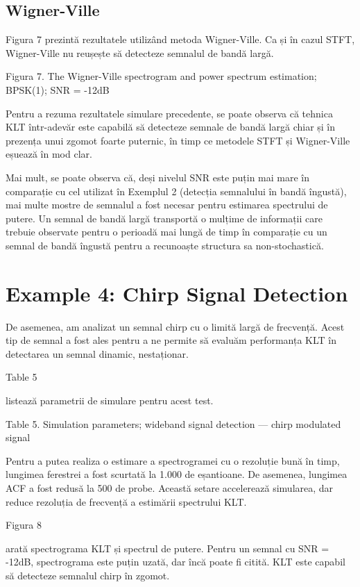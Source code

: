 \documentclass[12pt]{report}
\begin{document}
\subsection*{Wigner-Ville}

Figura 7 prezintă rezultatele utilizând metoda Wigner-Ville. Ca și în cazul STFT, Wigner-Ville nu reușește să detecteze semnalul de bandă largă.
\begin{center}
	\color{blue}Figura 7. The Wigner-Ville spectrogram and power spectrum estimation; BPSK(1); SNR = -12dB
\end{center}
Pentru a rezuma rezultatele simulare precedente, se poate observa că tehnica KLT într-adevăr este capabilă să detecteze semnale de bandă largă chiar și în prezența unui zgomot foarte puternic, în timp ce metodele STFT și Wigner-Ville eșuează în mod clar.

Mai mult, se poate observa că, deși nivelul SNR este puțin mai mare în comparație cu cel utilizat în Exemplul 2 (detecția semnalului în bandă îngustă), mai multe mostre de
semnalul a fost necesar pentru estimarea spectrului de putere. Un semnal de bandă largă transportă o mulțime de informații care trebuie observate pentru o perioadă mai lungă de timp în comparație cu un semnal de bandă îngustă pentru a recunoaște structura sa non-stochastică.

\section*{Example 4: Chirp Signal Detection}

De asemenea, am analizat un semnal chirp cu o limită largă de frecvență. Acest tip de semnal a fost ales pentru a ne permite să evaluăm performanța KLT în detectarea
un semnal dinamic, nestaționar.\ \begin{normalsize}\color{red}Table 5\end{normalsize} listează parametrii de simulare pentru acest test.
\begin{center}
	\color{blue}Table 5. Simulation parameters; wideband signal detection --- chirp modulated signal
\end{center}
Pentru a putea realiza o estimare a spectrogramei cu o rezoluție bună în timp, lungimea ferestrei a fost scurtată la 1.000 de eșantioane. De asemenea, lungimea ACF a fost redusă la 500 de probe. Această setare accelerează simularea, dar reduce rezoluția de frecvență a estimării spectrului KLT.

\begin{normalsize}\color{red}Figura 8\end{normalsize} arată spectrograma KLT și spectrul de putere. Pentru un semnal cu SNR = -12dB, spectrograma este puțin uzată, dar încă poate fi citită. KLT este capabil să detecteze semnalul chirp în zgomot.
\end{document}
